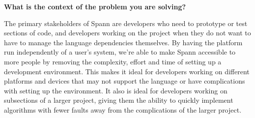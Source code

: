 \documentclass{article}
\begin{document}
\large
\textbf{What is the context of the problem you are solving?}\\
\normalsize

The primary stakeholders of Spann are developers who need to prototype or test
sections of code, and developers working on the project when they do not want
to have to manage the language dependencies themselves. By having the platform
run independently of a user’s system, we’re able to make Spann accessible to
more people by removing the complexity, effort and time of setting up a
development environment. This makes it ideal for developers working on
different platforms and devices that may not support the language or have
complications with setting up the environment. It also is ideal for developers
working on subsections of a larger project, giving them the ability to quickly
implement algorithms with fewer faults away from the complications of the
larger project.\\

% 
% 
% 
% 
\end{document}
